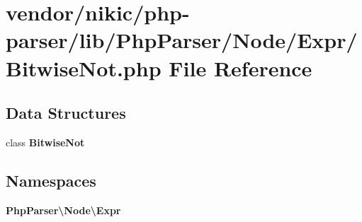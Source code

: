 \section{vendor/nikic/php-\/parser/lib/\+Php\+Parser/\+Node/\+Expr/\+Bitwise\+Not.php File Reference}
\label{_bitwise_not_8php}
\subsection*{Data Structures}
\begin{DoxyCompactItemize}
\item 
class {\bf Bitwise\+Not}
\end{DoxyCompactItemize}
\subsection*{Namespaces}
\begin{DoxyCompactItemize}
\item 
 {\bf Php\+Parser\textbackslash{}\+Node\textbackslash{}\+Expr}
\end{DoxyCompactItemize}
